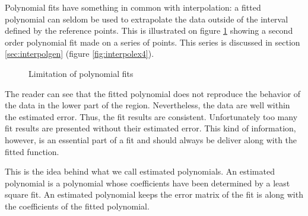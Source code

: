 \documentclass[twoside]{book}
\begin{document}
Polynomial fits have something in common with interpolation: a
fitted polynomial can seldom be used to extrapolate the data
outside of the interval defined by the reference points. This is
illustrated on figure \ref{fig:polFitLimit} showing a second order
polynomial fit made on a series of points. This series is
discussed in section \ref{sec:interpolgen} (figure
\ref{fig:interpolex4}).
\begin{figure}
\center{}
\caption{Limitation of polynomial fits}\label{fig:polFitLimit}
\end{figure}
The reader can see that the fitted polynomial does not reproduce
the behavior of the data in the lower part of the region.
Nevertheless, the data are well within the estimated error. Thus,
the fit results are consistent. Unfortunately too many fit results
are presented without their estimated error. This kind of
information, however, is an essential part of a fit and should
always be deliver along with the fitted function.

This is the idea behind what we call estimated polynomials. An
estimated polynomial is a polynomial whose coefficients have been
determined by a least square fit. An estimated polynomial keeps
the error matrix of the fit is along with the coefficients of the
fitted polynomial.

\end{document}
